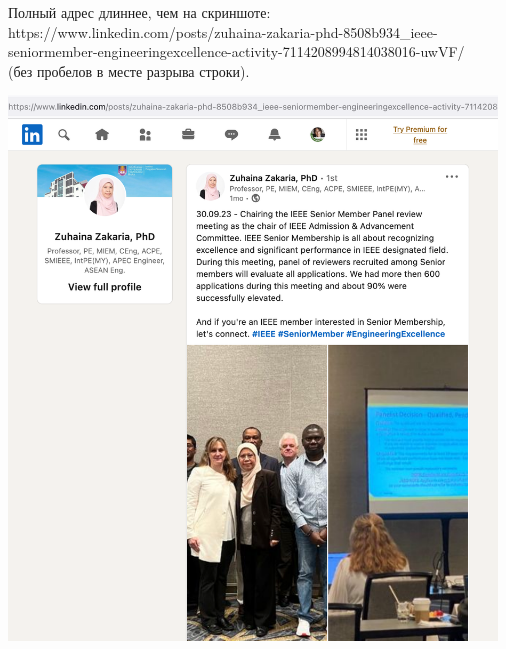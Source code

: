 
Полный адрес длиннее, чем на скриншоте:
https://www.linkedin.com/posts/zuhaina-zakaria-phd-8508b934\_ieee-seniormember-engineeringexcellence-activity-7114208994814038016-uwVF/\\
(без пробелов в месте разрыва строки).

\begin{center}
    \includegraphics[width=35em]{zakaria-meeting}
\end{center}

\pagebreak
